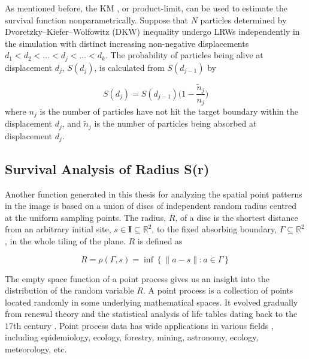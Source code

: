 As mentioned before, the KM \cite{kaplan1958nonparametric}, or
product-limit, can be used to estimate the survival function
nonparametrically. Suppose that $N$ particles determined by
Dvoretzky–Kiefer–Wolfowitz (DKW) inequality
\cite{dvoretzky1956asymptotic} undergo LRWs independently in the
simulation with distinct increasing non-negative displacements $d_1<
d_2< ...<d_j <...<d_k$. The probability of particles being alive at
displacement $d_j$, $S(d_j)$, is calculated from $S(d_{j-1})$ by

\begin{equation}\label{eq:km_disp}
  S(d_j) = S(d_{j-1}) \Big( 1-\frac{\tilde{n}_j}{n_j} \Big)
\end{equation}
where $n_j$ is the number of particles have not hit the target
boundary within the displacement $d_j$, and $\tilde{n}_j$ is the number of
particles being absorbed at displacement $d_j$. 




\subsection{Survival Analysis of Radius S(r)}


Another function generated in this thesis for analyzing the spatial
point patterns in the image is based on a union of discs of
independent random radius centred at the uniform sampling points. The
radius, $R$, of a disc is the shortest distance from an arbitrary
initial site, $s \in \bm{I} \subseteq \mathbb{R}^2$, to the fixed
absorbing boundary, $\Gamma \subseteq \mathbb{R}^2$, in the whole
tiling of the plane. $R$ is defined as

\begin{equation}\label{eq:dist_point_set}
  R = \rho(\Gamma, s) = \inf \left\{ \lVert a-s \lVert : a \in \Gamma \right\}
\end{equation}


The empty space function \cite{baddeley2007spatial} of a point process
\cite{zahle1982random} gives us an insight into the distribution of
the random variable $R$. A point process is a collection of points
located randomly in some underlying mathematical spaces. It evolved
gradually from renewal theory and the statistical analysis of life
tables dating back to the $17$th century
\cite{daley2007introduction}. Point process data has wide applications
in various fields \cite{daley2007introduction}, including
epidemiology, ecology, forestry, mining, astronomy, ecology,
meteorology, etc.

